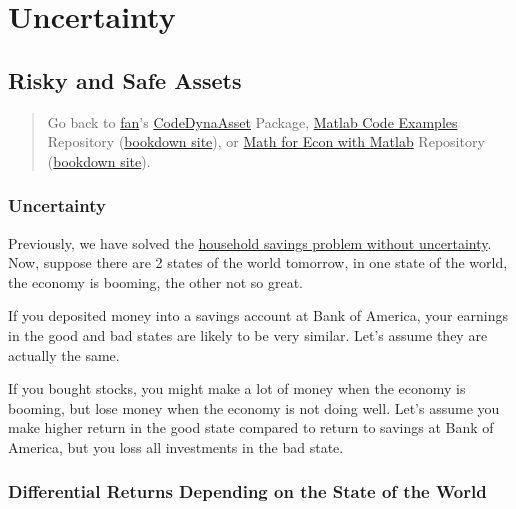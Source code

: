 \documentclass[
]{book}
\begin{document}
\hypertarget{uncertainty}{%
\chapter{Uncertainty}\label{uncertainty}}

\hypertarget{risky-and-safe-assets}{%
\section{Risky and Safe Assets}\label{risky-and-safe-assets}}

\begin{quote}
Go back to \href{http://fanwangecon.github.io/}{fan}'s \href{https://fanwangecon.github.io/CodeDynaAsset/}{CodeDynaAsset} Package, \href{https://fanwangecon.github.io/M4Econ/}{Matlab Code Examples} Repository (\href{https://fanwangecon.github.io/M4Econ/bookdown}{bookdown site}), or \href{https://fanwangecon.github.io/Math4Econ/}{Math for Econ with Matlab} Repository (\href{https://fanwangecon.github.io/Math4Econ/bookdown}{bookdown site}).
\end{quote}

\hypertarget{uncertainty-1}{%
\subsection{\texorpdfstring{\textbf{Uncertainty}}{Uncertainty}}\label{uncertainty-1}}

Previously, we have solved the \href{https://fanwangecon.github.io/Math4Econ/derivative_application/K_save_households.html}{household savings problem without
uncertainty}.
Now, suppose there are 2 states of the world tomorrow, in one state of
the world, the economy is booming, the other not so great.

If you deposited money into a savings account at Bank of America, your
earnings in the good and bad states are likely to be very similar. Let's
assume they are actually the same.

If you bought stocks, you might make a lot of money when the economy is
booming, but lose money when the economy is not doing well. Let's assume
you make higher return in the good state compared to return to savings
at Bank of America, but you loss all investments in the bad state.

\hypertarget{differential-returns-depending-on-the-state-of-the-world}{%
\subsection{Differential Returns Depending on the State of the World}\label{differential-returns-depending-on-the-state-of-the-world}}
\end{document}
